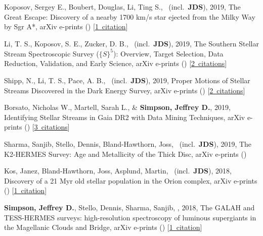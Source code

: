 \item[{\color{numcolor}\scriptsize7}] Koposov, Sergey E., Boubert, Douglas, Li, Ting S., \etal\ (incl.\ \textbf{JDS}), 2019, The Great Escape: Discovery of a nearby 1700 km/s star ejected from the Milky Way by Sgr A*, arXiv e-prints () [\href{https://ui.adsabs.harvard.edu/#abs/2019arXiv190711725K}{1~citation}]

\item[{\color{numcolor}\scriptsize6}] Li, T. S., Koposov, S. E., Zucker, D. B., \etal\ (incl.\ \textbf{JDS}), 2019, The Southern Stellar Stream Spectroscopic Survey (${\{}S{\}}^5$): Overview, Target Selection, Data Reduction, Validation, and Early Science, arXiv e-prints () [\href{https://ui.adsabs.harvard.edu/#abs/2019arXiv190709481L}{2~citations}]

\item[{\color{numcolor}\scriptsize5}] Shipp, N., Li, T. S., Pace, A. B., \etal\ (incl.\ \textbf{JDS}), 2019, Proper Motions of Stellar Streams Discovered in the Dark Energy Survey, arXiv e-prints () [\href{https://ui.adsabs.harvard.edu/#abs/2019arXiv190709488S}{2~citations}]

\item[{\color{numcolor}\scriptsize4}] Borsato, Nicholas W., Martell, Sarah L., \& \textbf{Simpson, Jeffrey D.}, 2019, Identifying Stellar Streams in Gaia DR2 with Data Mining Techniques, arXiv e-prints () [\href{https://ui.adsabs.harvard.edu/#abs/2019arXiv190702527B}{3~citations}]

\item[{\color{numcolor}\scriptsize3}] Sharma, Sanjib, Stello, Dennis, Bland-Hawthorn, Joss, \etal\ (incl.\ \textbf{JDS}), 2019, The K2-HERMES Survey: Age and Metallicity of the Thick Disc, arXiv e-prints ()

\item[{\color{numcolor}\scriptsize2}] Kos, Janez, Bland-Hawthorn, Joss, Asplund, Martin, \etal\ (incl.\ \textbf{JDS}), 2018, Discovery of a 21 Myr old stellar population in the Orion complex, arXiv e-prints () [\href{https://ui.adsabs.harvard.edu/#abs/2018arXiv181111762K}{1~citation}]

\item[{\color{numcolor}\scriptsize1}] \textbf{Simpson, Jeffrey D.}, Stello, Dennis, Sharma, Sanjib, \etal, 2018, The GALAH and TESS-HERMES surveys: high-resolution spectroscopy of luminous supergiants in the Magellanic Clouds and Bridge, arXiv e-prints () [\href{https://ui.adsabs.harvard.edu/#abs/2018arXiv180405900S}{1~citation}]